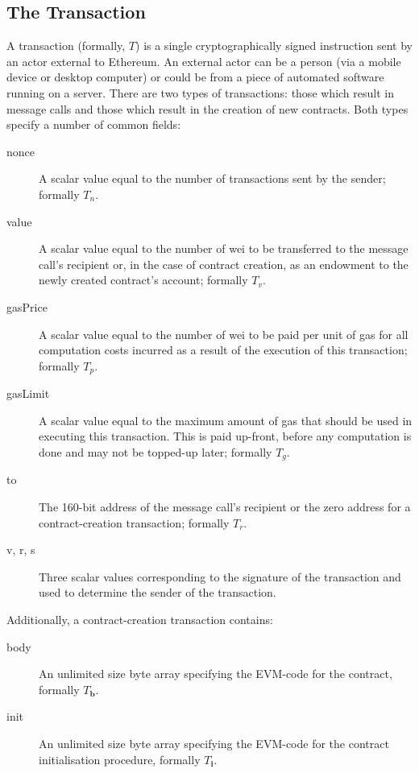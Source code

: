\documentclass[9pt,oneside]{amsart}
\begin{document}
\begin{multicols}{2}
\subsection{The Transaction} \label{ch:transaction}

A transaction (formally, $T$) is a single cryptographically signed instruction sent by an actor external to Ethereum. An external actor can be a person (via a mobile device or desktop computer) or could be from a piece of automated software running on a server. There are two types of transactions: those which result in message calls and those which result in the creation of new contracts. Both types specify a number of common fields:

\begin{description}
\item[nonce] A scalar value equal to the number of transactions sent by the sender; formally $T_n$.
\item[value] A scalar value equal to the number of wei to be transferred to the message call's recipient or, in the case of contract creation, as an endowment to the newly created contract's account; formally $T_v$.
\item[gasPrice] A scalar value equal to the number of wei to be paid per unit of gas for all computation costs incurred as a result of the execution of this transaction; formally $T_p$.
\item[gasLimit] A scalar value equal to the maximum amount of gas that should be used in executing this transaction. This is paid up-front, before any computation is done and may not be topped-up later; formally $T_g$.
\item[to] The 160-bit address of the message call's recipient or the zero address for a contract-creation transaction; formally $T_r$.
\item[v, r, s] Three scalar values corresponding to the signature of the transaction and used to determine the sender of the transaction.
\end{description}

Additionally, a contract-creation transaction contains:

\begin{description}
\item[body] An unlimited size byte array specifying the EVM-code for the contract, formally $T_\mathbf{b}$.
\item[init] An unlimited size byte array specifying the EVM-code for the contract initialisation procedure, formally $T_\mathbf{i}$.
\end{description}


\end{multicols}
\end{document}
